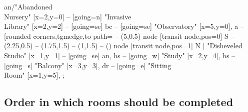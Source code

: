 \documentclass[a5paper]{extarticle}
\begin{document}
\begin{adjustbox}{max width=\linewidth}
\begin{gamemap}[set grid={10em}{6em}]
{  an/"Abandoned\\Nursery" [x=2,y=0] -- [going=n]
  "Invasive\\Library" [x=2,y=2] -- [going=se]
  bc -- [going=se]
  "Observatory" [x=5,y=0],
  a -- [rounded corners,tgmedge,to path={ -- (5,0.5) node [transit node,pos=0] {S} -- (2.25,0.5) -- (1.75,1.5) -- (1,1.5) -- (\tikztotarget) node [transit node,pos=1] {N} }]
  "Disheveled\\Studio" [x=1,y=1] -- [going=se]
  an,
  hs -- [going=w]
  "Study" [x=2,y=4],
  hs -- [going=s]
  "Balcony" [x=3,y=3],
  dr -- [going=e]
  "Sitting\\Room" [x=1,y=5],
};
\end{gamemap}
\end{adjustbox}

\subsection{Order in which rooms should be completed}
\end{document}
